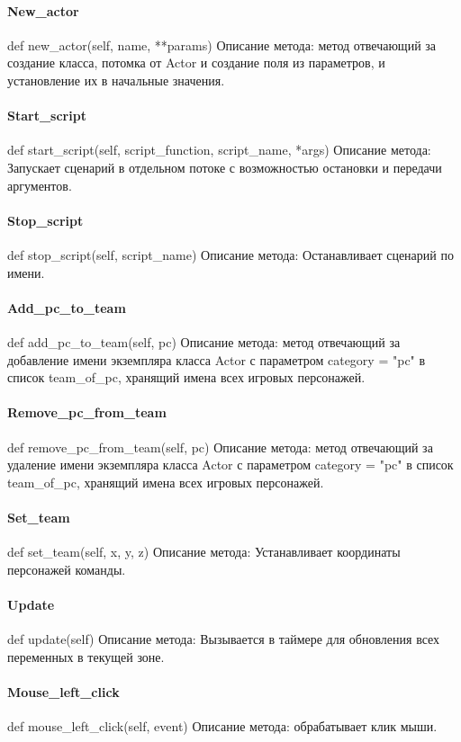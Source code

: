 \paragraph{New\_actor}
def new\_actor(self, name, **params)
Описание метода: метод отвечающий за создание класса, потомка от Actor и создание поля из параметров, и установление их в начальные значения.
\paragraph{Start\_script}
def start\_script(self, script\_function, script\_name, *args)
Описание метода: Запускает сценарий в отдельном потоке с возможностью остановки и передачи аргументов.
\paragraph{Stop\_script}
def stop\_script(self, script\_name)
Описание метода: Останавливает сценарий по имени.
\paragraph{Add\_pc\_to\_team}
def add\_pc\_to\_team(self, pc)
Описание метода: метод отвечающий за добавление имени экземпляра класса Actor с параметром category = "pc" в список team\_of\_pc, хранящий имена всех игровых персонажей.
\paragraph{Remove\_pc\_from\_team}
def remove\_pc\_from\_team(self, pc)
Описание метода: метод отвечающий за удаление имени экземпляра класса Actor с параметром category = "pc" в список team\_of\_pc, хранящий имена всех игровых персонажей.
\paragraph{Set\_team}
def set\_team(self, x, y, z)
Описание метода: Устанавливает координаты персонажей команды.
\paragraph{Update}
def update(self)
Описание метода: Вызывается в таймере для обновления всех переменных в текущей зоне.
\paragraph{Mouse\_left\_click}
def mouse\_left\_click(self, event)
Описание метода: обрабатывает клик мыши.
